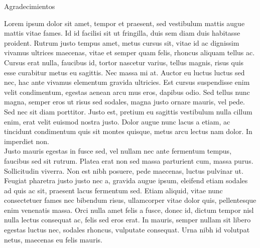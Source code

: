 \begin{center}
\large{Agradecimientos}\\
\end{center}
Lorem ipsum dolor sit amet, tempor et praesent, sed vestibulum mattis augue mattis vitae fames. Id id facilisi sit ut fringilla, duis sem diam duis habitasse proident. Rutrum justo tempus amet, metus cursus sit, vitae id ac dignissim vivamus ultrices maecenas, vitae et semper quam felis, rhoncus aliquam tellus ac. Cursus erat nulla, faucibus id, tortor nascetur varius, tellus magnis, risus quis esse curabitur metus eu sagittis. Nec massa mi at. Auctor eu luctus luctus sed nec, hac ante vivamus elementum gravida ultricies. Est cursus suspendisse enim velit condimentum, egestas aenean arcu mus eros, dapibus odio. Sed tellus nunc magna, semper eros ut risus sed sodales, magna justo ornare mauris, vel pede. Sed nec sit diam porttitor. Justo est, pretium eu sagittis vestibulum nulla cillum enim, erat velit euismod nostra justo. Dolor augue nunc lacus a etiam, ac tincidunt condimentum quis sit montes quisque, metus arcu lectus nam dolor. In imperdiet non. \\

Justo mauris egestas in fusce sed, vel nullam nec ante fermentum tempus, faucibus sed sit rutrum. Platea erat non sed massa parturient cum, massa purus. Sollicitudin viverra. Non est nibh posuere, pede maecenas, luctus pulvinar ut. Feugiat pharetra justo justo nec a, gravida augue ipsum, eleifend etiam sodales ad quis ac sit, praesent lacus fermentum sed. Etiam aliquid, vitae nunc consectetuer fames nec bibendum risus, ullamcorper vitae dolor quis, pellentesque enim venenatis massa. Orci nulla amet felis a fusce, donec id, dictum tempor nisl nulla lectus consequat ac, felis sed eros erat. In mauris, semper nullam sit libero egestas luctus nec, sodales rhoncus, vulputate consequat. Urna nibh id volutpat netus, maecenas eu felis mauris.\\